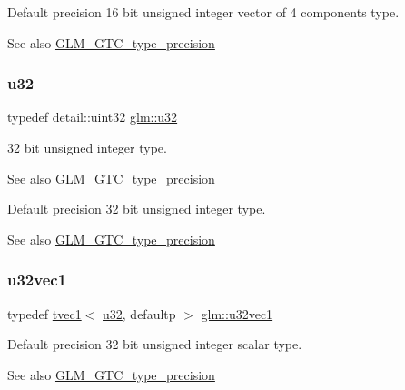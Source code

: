 Default precision 16 bit unsigned integer vector of 4 components type. \begin{DoxySeeAlso}{See also}
\hyperlink{group__gtc__type__precision}{G\+L\+M\+\_\+\+G\+T\+C\+\_\+type\+\_\+precision} 
\end{DoxySeeAlso}
\mbox{\label{group__gtc__type__precision_ga54e837745059fd29017bed71cfa0a8db}} 
\subsubsection{\texorpdfstring{u32}{u32}}
{\footnotesize\ttfamily typedef detail\+::uint32 \hyperlink{group__gtc__type__precision_ga54e837745059fd29017bed71cfa0a8db}{glm\+::u32}}

32 bit unsigned integer type. \begin{DoxySeeAlso}{See also}
\hyperlink{group__gtc__type__precision}{G\+L\+M\+\_\+\+G\+T\+C\+\_\+type\+\_\+precision}
\end{DoxySeeAlso}
Default precision 32 bit unsigned integer type. \begin{DoxySeeAlso}{See also}
\hyperlink{group__gtc__type__precision}{G\+L\+M\+\_\+\+G\+T\+C\+\_\+type\+\_\+precision} 
\end{DoxySeeAlso}
\mbox{\label{group__gtc__type__precision_ga09dd72852808c32ba398674736b9672a}} 
\subsubsection{\texorpdfstring{u32vec1}{u32vec1}}
{\footnotesize\ttfamily typedef \hyperlink{structglm_1_1tvec1}{tvec1}$<$ \hyperlink{group__gtc__type__precision_ga54e837745059fd29017bed71cfa0a8db}{u32}, defaultp $>$ \hyperlink{group__gtc__type__precision_ga09dd72852808c32ba398674736b9672a}{glm\+::u32vec1}}

Default precision 32 bit unsigned integer scalar type. \begin{DoxySeeAlso}{See also}
\hyperlink{group__gtc__type__precision}{G\+L\+M\+\_\+\+G\+T\+C\+\_\+type\+\_\+precision} 
\end{DoxySeeAlso}
\mbox{\label{group__gtc__type__precision_gad3a81c0d5a6941bb9ffdc9fa8611b426}} 
